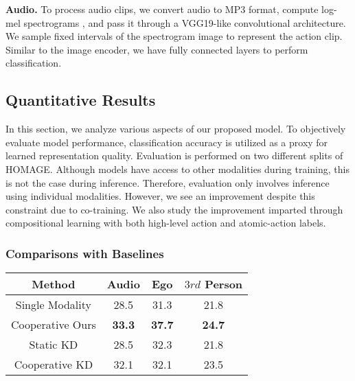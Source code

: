\documentclass[final]{cvpr}
\begin{document}
\noindent\textbf{Audio.} To process audio clips, we convert audio to MP3 format, compute log-mel spectrograms \cite{logmel}, and pass it through a VGG19-like convolutional architecture. We sample fixed intervals of the spectrogram image to represent the action clip. Similar to the image encoder, we have fully connected layers to perform classification.

\vspace{-1pt}





\subsection{Quantitative Results}

In this section, we analyze various aspects of our proposed model. To objectively evaluate model performance, classification accuracy is utilized as a proxy for learned representation quality. Evaluation is performed on two different splits of HOMAGE. Although models have access to other modalities during training, this is not the case during inference. Therefore, evaluation only involves inference using individual modalities. However, we see an improvement despite this constraint due to co-training. We also study the improvement imparted through compositional learning with both high-level action and atomic-action labels.

\vspace{-5pt}
\subsubsection{Comparisons with Baselines}

\begin{table}[t]
\centering
\renewcommand{\arraystretch}{1.0}
\renewcommand{\tabcolsep}{2mm}
\small
\begin{tabular}{c|c|c|c}
    \toprule
    Method & Audio & Ego & $3rd$ Person \\
    \midrule
    Single Modality    & 28.5 & 31.3 & 21.8 \\
    Cooperative Ours  & \textbf{33.3} & \textbf{37.7} & \textbf{24.7} \\
    \midrule
    Static KD       & 28.5 & 32.3 & 21.8 \\
    Cooperative KD  & 32.1 & 32.1 & 23.5 \\
    \bottomrule
\end{tabular}
\normalsize
\vspace{-5pt}
\vspace{-10pt}
\label{table:baselines}
\end{table}
\end{document}
